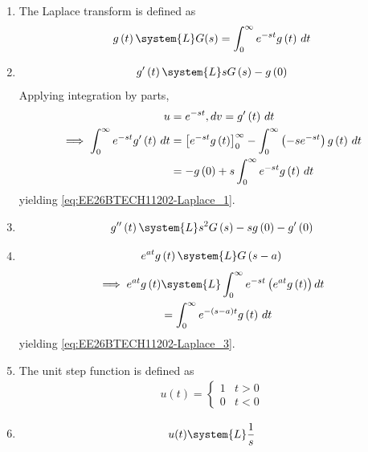 \begin{enumerate}[label=\thesubsection.\arabic*, ref=\thesubsection.\theenumi]
\item The Laplace transform is defined as
\begin{align}
g\brak{t} \system{L} G(s) = \int_{0}^{\infty} e^{-st} g\brak{t} \, dt
\end{align}
\item \begin{align}
g^{\prime}\brak{t} \system{L}s G\brak{s}-g\brak{0} 
\label{eq:EE26BTECH11202-Laplace_1}
\end{align}
\solution 
Applying integration by parts, 
\begin{align}
	u &= e^{-st}, dv = g^{\prime}\left(t\right) \, dt 
\\
\implies \int_{0}^{\infty} e^{-st} g^{\prime}\left(t\right) \, dt
	  &=
 \left[ e^{-st} g\left(t\right) \right]_{0}^{\infty} - \int_{0}^{\infty} \left(-s e^{-st}\right) g\left(t\right) \, dt \\
	  &=   - g\left(0\right)  + s \int_{0}^{\infty} e^{-st} g\left(t\right) \, dt 
\end{align}
yielding \eqref{eq:EE26BTECH11202-Laplace_1}.
\item 
\begin{align}
g^{\prime \prime}\brak{t} \system{L} s^2 G\brak{s} -sg\brak{0}-g^{\prime}\brak{0} 
\label{eq:EE26BTECH11202-Laplace_2}
\end{align}
\item 
\begin{align}
	e^{at} g\brak{t} \system{L} G\brak{s-a} 
	\label{eq:EE26BTECH11202-Laplace_3}
\end{align}
\solution
\begin{align}
	\implies e^{at} g\brak{t} &\system{L} \int_{0}^{\infty} e^{-st} \brak{e^{at} g\brak{t}} dt
	\\
				  &= \int_{0}^{\infty} e^{-\brak{s - a}t} g\brak{t} \, dt
\end{align}
yielding
\eqref{eq:EE26BTECH11202-Laplace_3}.
\item The unit step function is defined as
\begin{align}
	u(t) = 
	\begin{cases}
		1 & t > 0
		\\
		0 & t < 0
	\end{cases}
	\label{eq:EE26BTECH11202-step-func}
\end{align}
\item 
\begin{align}
	u(t) \system{L} \frac{1}{s} 
	\label{eq:EE26BTECH11202-Laplace_4.1}
\end{align}
\solution
\begin{align}

\end{align}
\end{enumerate}
